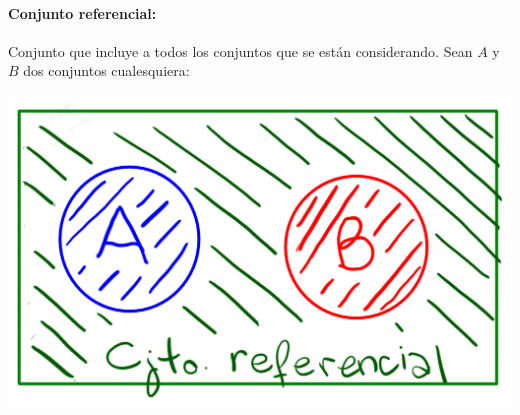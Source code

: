 \paragraph{Conjunto referencial: }
Conjunto que incluye a todos los conjuntos que se están considerando. Sean $A$ y $B$ dos conjuntos cualesquiera:
        \begin{center}
         \includegraphics[scale=0.3]{imagenes/cjto_referencial.png}
        \end{center}
        
